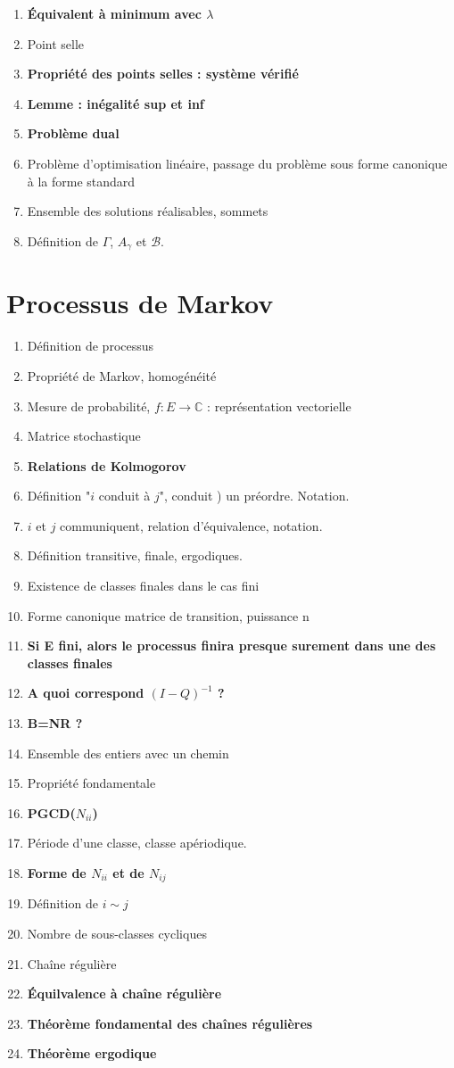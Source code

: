 \documentclass{article}
\begin{document}
\begin{enumerate}
\item \textbf{Équivalent à minimum avec $\lambda$}
\item Point selle
\item \textbf{Propriété des points selles : système vérifié}
\item \textbf{Lemme : inégalité sup et inf}
\item \textbf{Problème dual}
\item Problème d'optimisation linéaire, passage du problème sous forme canonique à la forme standard
\item Ensemble des solutions réalisables, sommets
\item Définition de $\Gamma$, $A_{\gamma}$ et $\mathcal{B}$. 
\end{enumerate}

\part{Processus de Markov}
\begin{enumerate}
\item Définition de processus
\item Propriété de Markov, homogénéité
\item Mesure de probabilité, $f:E\to\mathbb{C}$ : représentation vectorielle
\item Matrice stochastique
\item \textbf{Relations de Kolmogorov}
\item Définition "$i$ conduit à $j$", conduit ) un préordre. Notation.
\item $i$ et $j$ communiquent, relation d'équivalence, notation.
\item Définition transitive, finale, ergodiques.
\item Existence de classes finales dans le cas fini
\item Forme canonique matrice de transition, puissance n
\item \textbf{Si E fini, alors le processus finira presque surement dans une des classes finales}
\item \textbf{A quoi correspond $(I-Q)^{-1}$ ?}
\item \textbf{B=NR ?}
\item Ensemble des entiers avec un chemin
\item Propriété fondamentale
\item \textbf{PGCD($N_{ii}$)}
\item Période d'une classe, classe apériodique.
\item \textbf{Forme de $N_{ii}$ et de $N_{ij}$}
\item Définition de $i\sim j$
\item Nombre de sous-classes cycliques
\item Chaîne régulière
\item \textbf{Équilvalence à chaîne régulière}
\item \textbf{Théorème fondamental des chaînes régulières}
\item \textbf{Théorème ergodique}
\end{enumerate}
\end{document}
